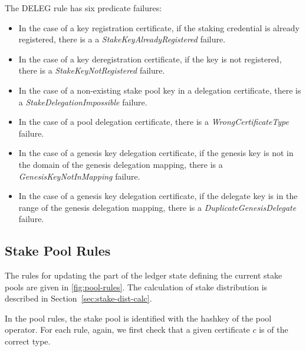 The DELEG rule has six predicate failures:
\begin{itemize}
\item In the case of a key registration certificate, if the staking credential
  is already registered, there is a a \emph{StakeKeyAlreadyRegistered} failure.
\item In the case of a key deregistration certificate, if the key is not
  registered, there is a \emph{StakeKeyNotRegistered} failure.
\item In the case of a non-existing stake pool key in a delegation certificate,
  there is a \emph{StakeDelegationImpossible} failure.
\item In the case of a pool delegation certificate, there is a
  \emph{WrongCertificateType} failure.
\item  In the case of a genesis key delegation certificate, if the genesis key is not
  in the domain of the genesis delegation mapping, there is a
  \emph{GenesisKeyNotInMapping} failure.
\item  In the case of a genesis key delegation certificate, if the delegate key is
  in the range of the genesis delegation mapping, there is a
  \emph{DuplicateGenesisDelegate} failure.
\end{itemize}

\clearpage

\subsection{Stake Pool Rules}
\label{sec:pool-rules}


The rules for updating the part of the ledger state defining the current stake
pools are given in \cref{fig:pool-rules}. The calculation of stake distribution
is described in Section~\ref{sec:stake-dist-calc}.

In the pool rules, the stake pool is identified with the hashkey of the pool operator.
For each rule, again, we first check that a given certificate $c$ is of the correct type.


